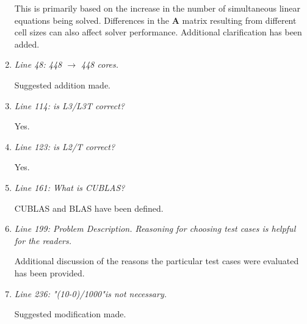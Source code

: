 \documentclass[12pt]{article} %
\begin{document}
\begin{enumerate}
This is primarily based on the increase in the number of simultaneous linear equations being solved. Differences in the \textbf{A} matrix resulting from different cell sizes can also affect solver performance. Additional clarification has been added. 

\item \textit{Line 48: 448 $\rightarrow$ 448 cores. } 

Suggested addition made.

\item \textit{Line 114: is L3/L3T correct? } 

Yes.

\item \textit{Line 123: is L2/T correct? } 

Yes.

\item \textit{Line 161: What is CUBLAS? } 

CUBLAS and BLAS have been defined.

\item \textit{Line 199: Problem Description. Reasoning for choosing test cases is helpful for the readers. } 

Additional discussion of the reasons the particular test cases were evaluated has been provided.

\item \textit{Line 236: "(10-0)/1000"is not necessary.} 

Suggested modification made.

\end{enumerate}
\end{document}
